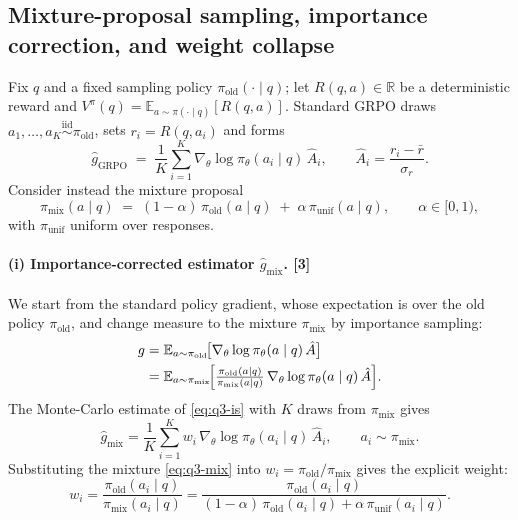 \documentclass[11pt,a4paper]{article}
\begin{document}
\subsection{Mixture-proposal sampling, importance correction, and weight collapse}
\label{sec:theory-q3}
Fix $q$ and a fixed sampling policy $\pi_{\mathrm{old}}(\cdot\mid q)$; let
$R(q,a)\in\mathbb{R}$ be a deterministic reward and
$V^{\pi}(q)=\mathbb{E}_{a\sim\pi(\cdot\mid q)}[R(q,a)]$. Standard GRPO draws
$a_1,\dots,a_K\stackrel{\mathrm{iid}}{\sim}\pi_{\mathrm{old}}$, sets $r_i=R(q,a_i)$ and forms
\begin{equation}
  \hat g_{\mathrm{GRPO}} \;=\; \frac{1}{K}\sum_{i=1}^{K}\nabla_\theta\log\pi_\theta(a_i\mid q)\,\hat A_i,
  \qquad \hat A_i=\frac{r_i-\bar r}{\sigma_r}.
  \label{eq:q3-grpo}
\end{equation}
Consider instead the mixture proposal
\begin{equation}
  \pi_{\mathrm{mix}}(a\mid q) \;=\; (1-\alpha)\,\pi_{\mathrm{old}}(a\mid q) \;+\; \alpha\,\pi_{\mathrm{unif}}(a\mid q),
  \qquad \alpha\in[0,1),
  \label{eq:q3-mix}
\end{equation}
with $\pi_{\mathrm{unif}}$ uniform over responses.

\paragraph{(i) Importance-corrected estimator $\hat g_{\mathrm{mix}}$. \hfill\textnormal{[3]}}
We start from the standard policy gradient, whose expectation is over the old policy $\pi_{\mathrm{old}}$,
and change measure to the mixture $\pi_{\mathrm{mix}}$ by importance sampling:
\begin{equation}
\begin{aligned}
  g&=\mathbb{E}_{a\sim\pi_{\mathrm{old}}}\!\bigl[\nabla_\theta\log\pi_\theta(a\mid q)\,\hat A\bigr]\\
   &=\mathbb{E}_{a\sim\pi_{\mathrm{mix}}}\!\Bigl[\tfrac{\pi_{\mathrm{old}}(a\mid q)}{\pi_{\mathrm{mix}}(a\mid q)}\,\nabla_\theta\log\pi_\theta(a\mid q)\,\hat A\Bigr].
\end{aligned}
\label{eq:q3-is}
\end{equation}
The Monte-Carlo estimate of \eqref{eq:q3-is} with $K$ draws from $\pi_{\mathrm{mix}}$ gives
\begin{equation}
  \hat g_{\mathrm{mix}}=\frac1K\sum_{i=1}^K w_i\,\nabla_\theta\log\pi_\theta(a_i\mid q)\,\hat A_i,
  \qquad a_i\sim\pi_{\mathrm{mix}}.
  \label{eq:q3-gmix}
\end{equation}
Substituting the mixture \eqref{eq:q3-mix} into $w_i=\pi_{\mathrm{old}}/\pi_{\mathrm{mix}}$ gives the explicit weight:
\begin{equation}
  w_i=\frac{\pi_{\mathrm{old}}(a_i\mid q)}{\pi_{\mathrm{mix}}(a_i\mid q)}
     =\frac{\pi_{\mathrm{old}}(a_i\mid q)}{(1-\alpha)\,\pi_{\mathrm{old}}(a_i\mid q)+\alpha\,\pi_{\mathrm{unif}}(a_i\mid q)}.
  \label{eq:q3-wi}
\end{equation}
\end{document}
